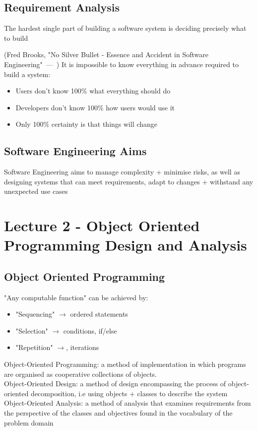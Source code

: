 \documentclass{article}
\let\oldquote\quote
\let\endoldquote\endquote
\renewenvironment{quote}[2][]
  {\if\relax\detokenize{#1}\relax
     \def\quoteauthor{#2}%
   \else
     \def\quoteauthor{#2~---~#1}%
   \fi
   \oldquote}
  {\par\nobreak\smallskip\hfill(\quoteauthor)%
   \endoldquote\addvspace{\bigskipamount}}
\begin{document}
\subsection{Requirement Analysis}
\begin{quote}{Fred Brooks, "No Silver Bullet - Essence and Accident in Software Engineering"}
    The hardest single part of building a software system is deciding precisely what to build
\end{quote}
It is impossible to know everything in advance required to build a system:
\begin{itemize}
    \item Users don't know 100\% what everything should do
    \item Developers don't know 100\% how users would use it
    \item Only 100\% certainty is that things will change
\end{itemize}
\subsection{Software Engineering Aims}
Software Engineering aims to manage complexity + minimise risks, as well as designing systems that can meet requirements, adapt to changes + withstand any unexpected use cases
\section{Lecture 2 - Object Oriented Programming Design and Analysis}
\subsection{Object Oriented Programming}
"Any computable function" can be achieved by:
\begin{itemize}
    \item "Sequencing" $\rightarrow$ ordered statements
    \item "Selection" $\rightarrow$ conditions, if/else
    \item "Repetition" $\rightarrow$, iterations
\end{itemize}
Object-Oriented Programming: a method of implementation in which programs are organised as cooperative collections of objects. \\ Object-Oriented Design: a method of design encompassing the process of object-oriented decomposition, i.e using objects + classes to describe the system \\
Object-Oriented Analysis: a method of analysis that examines requirements from the perspective of the classes and objectives found in the vocabulary of the problem domain
\end{document}
